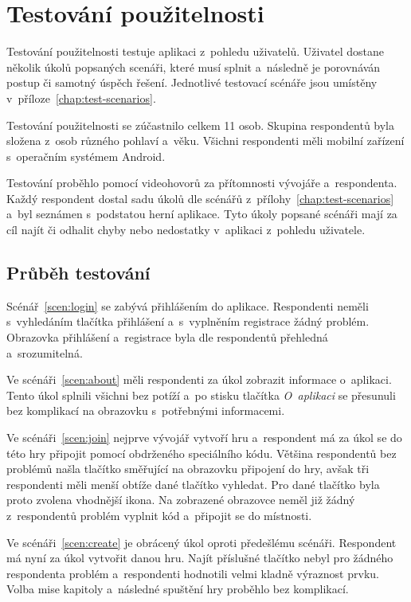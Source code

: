 \section{Testování použitelnosti}
\label{sec:usability}

Testování použitelnosti testuje aplikaci z~pohledu uživatelů.
Uživatel dostane několik úkolů popsaných scenáři,
které musí splnit a~následně je porovnáván postup či samotný úspěch řešení.
Jednotlivé testovací scénáře jsou umístěny v~příloze~\ref{chap:test-scenarios}.

Testování použitelnosti se zúčastnilo celkem 11 osob.
Skupina respondentů byla složena z~osob různého pohlaví a~věku.
Všichni respondenti měli mobilní zařízení s~operačním systémem Android.

Testování proběhlo pomocí videohovorů za přítomnosti vývojáře a~respondenta.
Každý respondent dostal sadu úkolů dle scénářů
z~přílohy~\ref{chap:test-scenarios}
a~byl seznámen s~podstatou herní aplikace.
Tyto úkoly popsané scénáři mají za cíl najít či odhalit chyby nebo nedostatky
v~aplikaci z~pohledu uživatele.

\subsection{Průběh testování}

Scénář~\ref{scen:login} se zabývá přihlášením do aplikace.
Respondenti neměli s~vyhledáním tlačítka přihlášení
a~s~vyplněním registrace žádný problém.
Obrazovka přihlášení a~registrace byla dle respondentů přehledná a~srozumitelná.

Ve scénáři~\ref{scen:about} měli respondenti za úkol zobrazit informace
o~aplikaci.
Tento úkol splnili všichni bez potíží a~po stisku tlačítka \emph{O~aplikaci}
se přesunuli bez komplikací na obrazovku s~potřebnými informacemi.

\pagebreak
Ve scénáři~\ref{scen:join} nejprve vývojář vytvoří hru a~respondent má za úkol
se do této hry připojit pomocí obdrženého speciálního kódu.
Většina respondentů bez problémů našla tlačítko směřující na obrazovku připojení
do hry,
avšak tři respondenti měli menší obtíže dané tlačítko vyhledat.
Pro dané tlačítko byla proto zvolena vhodnější ikona.
Na zobrazené obrazovce neměl již žádný z~respondentů problém vyplnit kód
a~připojit se do místnosti.

Ve scénáři~\ref{scen:create} je obrácený úkol oproti předešlému scénáři.
Respondent má nyní za úkol vytvořit danou hru.
Najít příslušné tlačítko nebyl pro žádného respondenta problém
a~respondenti hodnotili velmi kladně výraznost prvku.
Volba mise kapitoly a~následné spuštění hry proběhlo bez komplikací.


